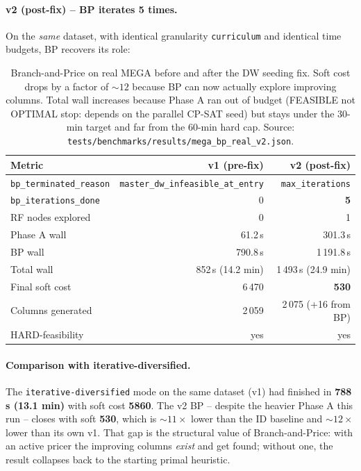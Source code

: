 \paragraph{v2 (post-fix) -- BP iterates 5 times.}
On the \emph{same} dataset, with identical granularity
\texttt{curriculum} and identical time budgets, BP recovers its
role:

\begin{table}[h]
\centering
\sffamily\small
\begin{tabular}{lrr}
\toprule
Metric & v1 (pre-fix) & v2 (post-fix) \\
\midrule
\texttt{bp\_terminated\_reason} & \texttt{master\_dw\_infeasible\_at\_entry} & \texttt{max\_iterations} \\
\texttt{bp\_iterations\_done}   & 0    & \textbf{5} \\
RF nodes explored                & 0    & 1 \\
Phase A wall                     & 61.2\,s & 301.3\,s \\
BP wall                          & 790.8\,s & 1\,191.8\,s \\
Total wall                       & 852\,s (14.2 min) & 1\,493\,s (24.9 min) \\
Final soft cost                  & 6\,470 & \textbf{530} \\
Columns generated                & 2\,059 & 2\,075 (+16 from BP) \\
HARD-feasibility                 & yes & yes \\
\bottomrule
\end{tabular}
\caption{Branch-and-Price on real MEGA before and after the DW
seeding fix. Soft cost drops by a factor of $\sim 12$ because
BP can now actually explore improving columns. Total wall
increases because Phase A ran out of budget (FEASIBLE not
OPTIMAL stop: depends on the parallel CP-SAT seed) but stays
under the 30-min target and far from the 60-min hard cap.
Source: \texttt{tests/benchmarks/results/mega\_bp\_real\_v2.json}.}
\label{tab:bench-bp-mega-real-en}
\end{table}

\paragraph{Comparison with iterative-diversified.} The
\texttt{iterative-diversified} mode on the same dataset (v1) had
finished in \textbf{788\,s (13.1 min)} with soft cost
\textbf{5860}. The v2 BP -- despite the heavier Phase A this run
-- closes with soft \textbf{530}, which is $\sim 11 \times$
lower than the ID baseline and $\sim 12 \times$ lower than its
own v1. That gap is the structural value of Branch-and-Price:
with an active pricer the improving columns \emph{exist} and
get found; without one, the result collapses back to the
starting primal heuristic.

